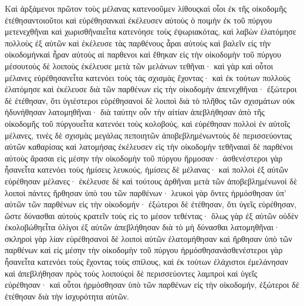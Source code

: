Καὶ ἀρξάμενοι πρῶτον τοὺς μέλανας κατενοοῦμεν λίθουςκαὶ οἷοι ἐκ τῆς οἰκοδομῆς ἐτέθησαντοιοῦτοι καὶ εὑρέθησανκαὶ ἐκέλευσεν αὐτοὺς ὁ ποιμὴν ἐκ τοῦ πύργου μετενεχθῆναι καὶ χωρισθῆναιεἶτα κατενόησε τοὺς ἐψωριακότας, καὶ λαβὼν ἐλατόμησε πολλοὺς ἐξ αὐτῶν καὶ ἐκέλευσε τὰς παρθένους ἆραι αὐτοὺς καὶ βαλεῖν εἰς τὴν οἰκοδομήνκαὶ ἦραν αὐτοὺς αἱ παρθενοι καὶ ἔθηκαν εἰς τὴν οἰκοδομὴν τοῦ πύργου μέσουτοὺς δὲ λοιποὺς ἐκέλευσε μετὰ τῶν μελάνων τεθῆναι· καὶ γὰρ καὶ οὗτοι μέλανες εὑρέθησανεἶτα κατενόει τοὺς τὰς σχισμὰς ἔχοντας· καὶ ἐκ τούτων πολλοὺς ἐλατόμησε καὶ ἐκέλευσε διὰ τῶν παρθένων εἰς τὴν οἰκοδομὴν ἀπενεχθῆναι· ἐξώτεροι δὲ ἐτέθησαν, ὅτι ὑγιέστεροι εὑρέθησανοἱ δὲ λοιποὶ διὰ τὸ πλῆθος τῶν σχισμάτων οὐκ ἠδυνήθησαν λατομηθῆναι· διὰ ταύτην οὖν τὴν αἰτίαν ἀπεβλήθησαν ἀπὸ τῆς οἰκοδομῆς τοῦ πύργουεἶτα κατενόει τοὺς κολοβούς, καὶ εὑρέθησαν πολλοὶ ἐν αὐτοῖς μέλανες, τινὲς δὲ σχισμὰς μεγάλας πεποιητῶν ἀποβεβλημένωντοὺς δὲ περισσεύοντας αὐτῶν καθαρίσας καὶ λατομήσας ἐκέλευσεν εἰς τὴν οἰκοδομὴν τεθῆναιαἱ δὲ παρθένοι αὐτοὺς ἄρασαι εἰς μέσην τὴν οἰκοδομὴν τοῦ πύργου ἥρμοσαν· ἀσθενέστεροι γὰρ ἦσανεἶτα κατενόει τοὺς ἡμίσεις λευκούς, ἡμίσεις δὲ μέλανας· καὶ πολλοὶ ἐξ αὐτῶν εὑρέθησαν μέλανες· ἐκέλευσε δὲ καὶ τούτους ἀρθῆναι μετὰ τῶν ἀποβεβλημένωνοἱ δὲ λοιποὶ πάντες ἤρθησαν ὑπὸ του τῶν παρθένων· λευκοὶ γὰρ ὄντες ἡρμόσθησαν ὑπ’ αὐτῶν τῶν παρθένων εἰς τὴν οἰκοδομήν· ἐξώτεροι δὲ ἐτέθησαν, ὅτι ὑγεῖς εὑρέθησαν, ὥστε δύνασθαι αὐτοὺς κρατεῖν τοὺς εἰς το μέσον τεθέντας· ὅλως γὰρ ἐξ αὐτῶν οὐδὲν ἐκολοβώθηεἶτα ὀλίγοι ἐξ αὐτῶν ἀπεβλήθησαν διὰ τὸ μὴ δύνασθαι λατομηθῆναι· σκληροὶ γὰρ λίαν εὑρέθησανοἱ δὲ λοιποὶ αὐτῶν ἐλατομήθησαν καὶ ἤρθησαν ὑπὸ τῶν παρθένων καὶ εἰς μέσην τὴν οἰκοδομὴν τοῦ πύργου ἡρμόσθησανἀσθενέστεροι γὰρ ἦσανεἶτα κατενόει τοὺς ἔχοντας τοὺς σπίλους, καὶ ἐκ τούτων ἐλάχιστοι ἐμελάνησαν καὶ ἀπεβλήθησαν πρὸς τοὺς λοιπούςοἱ δὲ περισσεύοντες λαμπροὶ καὶ ὑγεῖς εὑρέθησαν· καὶ οὗτοι ἡρμόσθησαν ὑπὸ τῶν παρθένων εἰς τὴν οἰκοδομήν, ἐξώτεροι δὲ ἐτέθησαν διὰ τὴν ἰσχυρότητα αὐτῶν.
